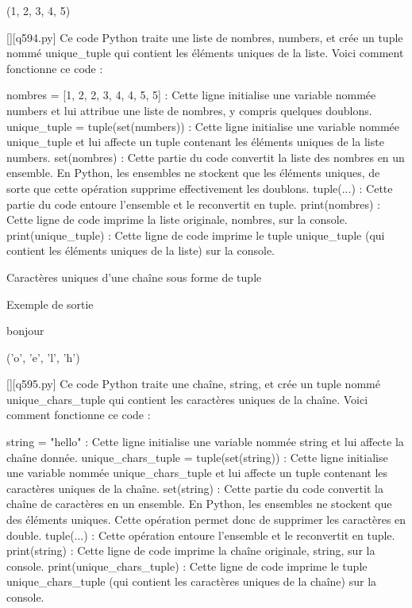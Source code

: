 (1, 2, 3, 4, 5)
        \par
        \begin{solution}
            \renewcommand{\nomfichier}{q594.py}
            \pythonfile{\chemincode \nomfichier}[][\nomfichier]
            Ce code Python traite une liste de nombres, numbers, et crée un tuple nommé unique\_tuple qui contient les éléments uniques de la liste. Voici comment fonctionne ce code :

    nombres = [1, 2, 2, 3, 4, 4, 5, 5] : Cette ligne initialise une variable nommée numbers et lui attribue une liste de nombres, y compris quelques doublons.
    unique\_tuple = tuple(set(numbers)) : Cette ligne initialise une variable nommée unique\_tuple et lui affecte un tuple contenant les éléments uniques de la liste numbers.
        set(nombres) : Cette partie du code convertit la liste des nombres en un ensemble. En Python, les ensembles ne stockent que les éléments uniques, de sorte que cette opération supprime effectivement les doublons.
        tuple(...) : Cette partie du code entoure l'ensemble et le reconvertit en tuple.
    print(nombres) : Cette ligne de code imprime la liste originale, nombres, sur la console.
    print(unique\_tuple) : Cette ligne de code imprime le tuple unique\_tuple (qui contient les éléments uniques de la liste) sur la console.
        \end{solution}
        

        \question
        Caractères uniques d'une chaîne sous forme de tuple

Exemple de sortie

bonjour

('o', 'e', 'l', 'h')
        \par
        \begin{solution}
            \renewcommand{\nomfichier}{q595.py}
            \pythonfile{\chemincode \nomfichier}[][\nomfichier]
            Ce code Python traite une chaîne, string, et crée un tuple nommé unique\_chars\_tuple qui contient les caractères uniques de la chaîne. Voici comment fonctionne ce code :

    string = "hello" : Cette ligne initialise une variable nommée string et lui affecte la chaîne donnée.
    unique\_chars\_tuple = tuple(set(string)) : Cette ligne initialise une variable nommée unique\_chars\_tuple et lui affecte un tuple contenant les caractères uniques de la chaîne.
        set(string) : Cette partie du code convertit la chaîne de caractères en un ensemble. En Python, les ensembles ne stockent que des éléments uniques. Cette opération permet donc de supprimer les caractères en double.
        tuple(...) : Cette opération entoure l'ensemble et le reconvertit en tuple.
    print(string) : Cette ligne de code imprime la chaîne originale, string, sur la console.
    print(unique\_chars\_tuple) : Cette ligne de code imprime le tuple unique\_chars\_tuple (qui contient les caractères uniques de la chaîne) sur la console.
        \end{solution}
        


